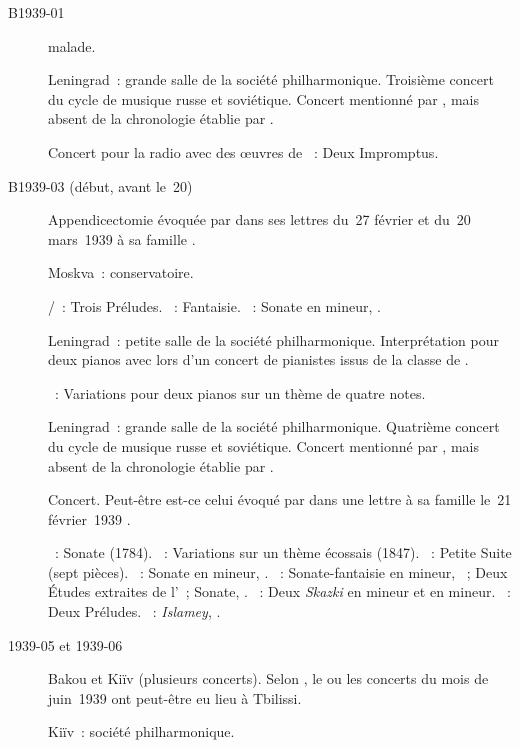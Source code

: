 \begin{description}
 \item[B1939-01]
 \VSofronitsky{} malade.
 \item[]
 Leningrad~: grande salle de la société philharmonique.
 Troisième concert du cycle de musique russe et soviétique.
 Concert mentionné par \citet[p.~160]{Nekrasova08}, mais absent de la
 chronologie établie par \citet[p.~413]{Scriabine}.
 \item[]
 Concert pour la radio avec des œuvres de \Scriabine{}~: Deux Impromptus.
 \item[B1939-03 (début, avant le~20)]
 Appendicectomie évoquée par \VSofronitsky{} dans ses lettres du~27 février
 et du~20 mars~1939 à sa famille \citep[p.~26]{Kogan08}.
 \item[]
 Moskva~: conservatoire.

 \textsc{\JBach{}/\Busoni{}}~: Trois Préludes.
 \textsc{\Mozart{}}~: Fantaisie.
 \textsc{\Chopin{}}~: Sonate en \kB \Flat mineur, .
 \item[]
 Leningrad~: petite salle de la société philharmonique.
 Interprétation pour deux pianos avec \DChostakovitch{} lors d'un concert de
 pianistes issus de la classe de \LNikolaiev{}.

 \textsc{\Nikolaiev{}}~: Variations pour deux pianos sur un thème de quatre
 notes.
 \item[]
 Leningrad~: grande salle de la société philharmonique.
 Quatrième concert du cycle de musique russe et soviétique.
 Concert mentionné par \citet[p.~160]{Nekrasova08}, mais absent de la
 chronologie établie par \citet[p.~413]{Scriabine}.
 \item[]
 Concert.
 Peut-être est-ce celui évoqué par \VSofronitsky{} dans une lettre à sa
 famille le~21 février~1939 \citep[p.~26]{Kogan08}.

 \textsc{\Bortnianski{}}~: Sonate (1784).
 \textsc{\Glinka{}}~: Variations sur un thème écossais (1847).
 \textsc{\Borodine{}}~: Petite Suite (sept pièces).
 \textsc{\Glazounov{}}~: Sonate en \kB \Flat mineur, .
 \textsc{\Scriabine{}}~: Sonate-fantaisie en \kG \Sharp mineur, ~;
 Deux Études extraites de l'~; Sonate, .
 \textsc{\Medtner{}}~: Deux \emph{Skazki} en \kB mineur et en \kE mineur.
 \textsc{\Rachmaninov{}}~: Deux Préludes.
 \textsc{\Balakirev{}}~: \emph{Islamey}, .
 \item[1939-05 et 1939-06]
 Bakou et Kiïv (plusieurs concerts).
 Selon \citet[p.~414]{Scriabine}, le ou les concerts du mois de juin~1939
 ont peut-être eu lieu à Tbilissi.
 \item[]
 Kiïv~: société philharmonique.


\end{description}
